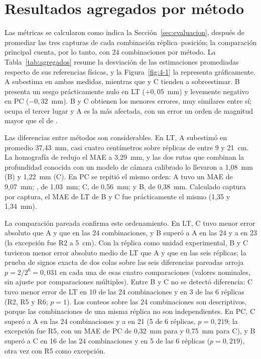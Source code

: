 \section{Resultados agregados por método}
\label{sec:agregados}

Las métricas se calcularon como indica la Sección~\ref{sec:evaluacion}, después de promediar las tres capturas de cada combinación réplica--posición; la comparación principal cuenta, por lo tanto, con 24 combinaciones por método. La Tabla~\ref{tab:agregados} resume la desviación de las estimaciones promediadas respecto de sus referencias físicas, y la Figura~\ref{fig:4-1} la representa gráficamente. A subestima en ambas medidas, mientras que \Aprime{} y C tienden a sobreestimar. B presenta un sesgo prácticamente nulo en LT ($+0{,}05$~mm) y levemente negativo en PC ($-0{,}32$~mm). B y C obtienen los menores errores, muy similares entre sí; \Aprime{} ocupa el tercer lugar y A es la más afectada, con un error un orden de magnitud mayor que el de \Aprime.

Las diferencias entre métodos son considerables. En LT, A subestimó en promedio 37,43~mm, casi cuatro centímetros sobre réplicas de entre 9 y 21~cm. La homografía de \Aprime{} redujo el MAE a 3,29~mm, y las dos rutas que combinan la profundidad conocida con un modelo de cámara calibrado lo llevaron a 1,08~mm (B) y 1,22~mm (C). En PC se repitió el mismo orden: A tuvo un MAE de 9,07~mm; \Aprime, de 1,03~mm; C, de 0,56~mm; y B, de 0,38~mm. Calculado captura por captura, el MAE de LT de B y C fue prácticamente el mismo (1,35 y 1,34~mm).

La comparación pareada confirma este ordenamiento. En LT, C tuvo menor error absoluto que A y que \Aprime{} en las 24 combinaciones, y B superó a A en las 24 y a \Aprime{} en 23 (la excepción fue R2 a 5~cm). Con la réplica como unidad experimental, B y C tuvieron menor error absoluto medio de LT que A y que \Aprime{} en las seis réplicas; la prueba de signos exacta de dos colas sobre las seis diferencias pareadas arroja $p = 2/2^{6} = 0{,}031$ en cada una de esas cuatro comparaciones (valores nominales, sin ajuste por comparaciones múltiples). Entre B y C no se detectó diferencia: C tuvo menor error de LT en 10 de las 24 combinaciones y en 3 de las 6 réplicas (R2, R5 y R6; $p = 1$). Los conteos sobre las 24 combinaciones son descriptivos, porque las combinaciones de una misma réplica no son independientes. En PC, C superó a A en las 24 combinaciones y a \Aprime{} en 21 (5 de 6 réplicas, $p = 0{,}219$; la excepción fue R5, con un MAE de PC de 0,32~mm para \Aprime{} y 0,75~mm para C), y B superó a C en 16 de las 24 combinaciones y en 5 de las 6 réplicas ($p = 0{,}219$), otra vez con R5 como excepción.

